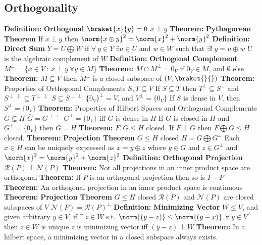 \documentclass[14pt]{extarticle}
\def\Definition{{\color{blue} \textbf{Definition:} }}
\def\Theorem{{\color{red} \textbf{Theorem:} }}
\begin{document}
\begin{outline}
	\section*{Orthogonality}
		\1	\Definition \textbf{Orthogonal}
			\2	$\braket{x}{y} = 0$ 
			\2	$x \perp y$
		\1	\Theorem \textbf{Pythagorean Theorem}
			\2	If $x \perp y$ then $\norm{x \oplus y}^2 = \norm{x}^2 + \norm{y}^2$
		\1	\Definition \textbf{Direct Sum}
			\2	$Y = U \bigoplus W$ if $\forall~y \in Y~\exists u \in U$ and $w \in W$
					such that $\exists!~y = u \oplus w$
			\2	$U$ is the algebraic complement of $W$
		\1	\Definition \textbf{Orthogonal Complement}
			\2	$M^{\perp} = \{x \in V~:~x \perp y~\forall y \in M\}$
		\1	\Theorem $M \cap M^{\perp} = 0_V$ if $0_V \in M$, and $\emptyset$ else
		\1	\Theorem $M \subseteq V$ then $M^{\perp}$ is a closed subspace of $(V,\braket{}{})$
		\1	\Theorem Properties of Orthogonal Complements
			\2	$S,T \subseteq V$
			\2	If $S \subseteq T$ then $T^{\perp} \subseteq S^{\perp}$ and $S^{\perp \perp} \subseteq T^{\perp \perp}$
			\2	$S \subseteq S^{\perp \perp}$
			\2	$\{0_V\}^{\perp} = V$, and $V^{\perp} = \{0_V\}$
			\2	If $S$ is dense in $V$, then $S^{\perp} = \{0_V\}$
		\1	\Theorem Properties of Hilbert Spaces and Orthogonal Complements
			\2	$G \subseteq H$
			\2	$\bar{G} = G^{\perp \perp}$
			\2	$G^{\perp} = \{0_V\}$ iff $G$ is dense in $H$
			\2	If $G$ is closed in $H$ and $G^{\perp} = \{0_V\}$ then $G = H$
		\1	\Theorem $F,G \le H$ closed.  If $F \perp G$ then $F \bigoplus G \le H$
		closed.
		\1	\Theorem \textbf{Projection Theorem}
			\2	$G \le H$ closed
			\2	$H = G \bigoplus G^{\perp}$
			\2	Each $x \in H$ can be uniquely expressed as $x = y \oplus z$ where
					$y \in G$ and $z \in G^{\perp}$ and $\norm{x}^2 = \norm{y}^2 + \norm{z}^2$
		\1	\Definition \textbf{Orthogonal Projection}
			\2	$\mathcal{R}(P) \perp \mathcal{N}(P)$
		\1	\Theorem Not all projections in an inner product space are orthogonal
		\1	\Theorem If $P$ is an orthogonal projection then so is $I - P$
		\1	\Theorem An orthogonal projection in an inner product space is continuous
		\1	\Theorem \textbf{Projection Theorem}
			\2	$G \le H$ closed
			\2	$\mathcal{R}(P)$ and $\mathcal{N}(P)$ are closed subspaces of $V$
			\2	$\mathcal{N}(P) = \mathcal{R}(P)^{\perp}$
		\1	\Definition \textbf{Minimizing Vector}
			\2	$W \le V$, and given arbitrary $y \in V$, if $\exists~z \in W$ s.t.
			\2	$\norm{(y - z)} \le \norm{(y - x)}$ $\forall~y \in V$ then $z \in W$ is unique
			\2	$z$ is minimizing vector iff $(y - z) \perp W$
		\1	\Theorem In a hilbert space, a minimizing vector in a closed subspace always exists.

\end{outline}
\end{document}
